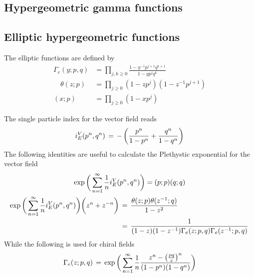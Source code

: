 \begin{appendices}
\chapter{Hypergeometric gamma  functions}
\label{appendix:gamma_functions}
\section{Elliptic hypergeometric functions}
The elliptic functions are defined by
\begin{equation} 
	\begin{aligned}
	   \Gamma_e (y;p,q) &= \prod_{j,k \geq 0} \frac{ 1 - y^{-1} p^{j+1} q^{k+1}}{ 1 - y p^j q^k}\\
	  \quad \theta(z;p) &= \prod_{j \geq 0 } (1- z p^j) ( 1- z^{-1}p^{j+1}) \\
	  (x;p) &= \prod_{j \geq 0} ( 1- xp^j)
  	\end{aligned}
\label{eqn:ellptic_hyper_definitions}
\end{equation}

The single particle index for the vector field reads
\begin{equation}
   i_E^V(p^n,q^n) \, = \, - \left( {p^n \over 1-p^n} + {q^n \over 1-q^n} \right)
\end{equation}
The following identities are useful to calculate the Plethystic exponential for the vector field
\begin{gather}
  \exp \bigg( \sum_{n=1}^{\infty} {1 \over n} i_E^{V} (p^n,q^n) \bigg)  = (p;p) (q;q) 
 \label{eqn:elliptic_index_vector_zero_modes_identity}
 \\
\begin{aligned}
\exp \bigg( \sum_{n=1}^{\infty} {1 \over n} i_E^{V} (p^n,q^n) \bigg) \bigg( z^n + z^{-n} \bigg) \,& =
\,  \frac{ \theta ( z;p) \theta (z^{-1};q) }{ 1-z^2 } \\
& =  \, \frac{1}{ ( 1 - z ) ( 1 - z^{-1}) \Gamma_e( z;p,q) \Gamma_e( z^{-1}; p,q)} \,
\label{eqn:elliptic_index_vector_adjoint}
\end{aligned}
\end{gather}
While the following is used for chiral fields
\begin{equation}
\Gamma_e(z;p,q) \, = \, \exp \bigg( \sum_{n=1}^{\infty} {1 \over n }
 \frac{ z^n - \big( {pq \over z} \big)^n }{(1-p^n) ( 1-q^n)} \bigg)
 \label{eqn:elliptic_gamma_chiral_identity}
\end{equation}



\end{appendices}
